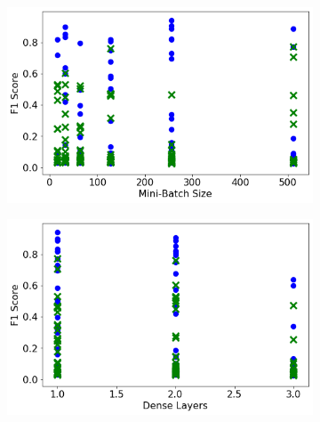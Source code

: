 \begin{figure}[H]
     \begin{subfigure}[b]{0.49\textwidth}
         \centering
         \includegraphics[width=\textwidth]{images/dnn_batch_size.png}
         \caption{}
         \label{fig:dnn_batch_size}
     \end{subfigure}
     \hfill
     \begin{subfigure}[b]{0.49\textwidth}
         \centering
         \includegraphics[width=\textwidth]{images/dnn_dense_layers_total.png}
         \caption{}
         \label{fig:dnn_dense_layers_total}
     \end{subfigure}


\end{figure}
